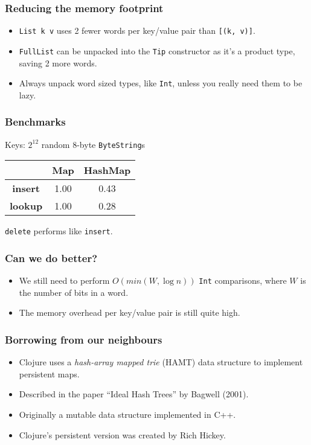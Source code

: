 \documentclass{beamer}
\begin{document}
\begin{frame}
  \frametitle{Reducing the memory footprint}
  \begin{itemize}
  \item \lstinline!List k v! uses 2 fewer words per key/value pair
    than \lstinline![(k, v)]!.
  \item \lstinline!FullList! can be unpacked into the \lstinline!Tip!
    constructor as it's a product type, saving 2 more words.
  \item Always unpack word sized types, like \lstinline!Int!, unless
    you really need them to be lazy.
  \end{itemize}
\end{frame}

\begin{frame}
  \frametitle{Benchmarks}

  Keys: $2^{12}$ random 8-byte \lstinline!ByteString!s

  \bigskip
  \begin{tabular}{|c|c|c|}
    \hline  & \textbf{Map} & \textbf{HashMap} \\
    \hline \textbf{insert} & 1.00 & 0.43 \\
    \hline \textbf{lookup} & 1.00 & 0.28 \\
    \hline
  \end{tabular}
  \bigskip

  \lstinline!delete! performs like \lstinline!insert!.
\end{frame}

\begin{frame}
  \frametitle{Can we do better?}
  \begin{itemize}
  \item We still need to perform $O(min(W, \log n))$ \lstinline!Int!
    comparisons, where $W$ is the number of bits in a word.
  \item The memory overhead per key/value pair is still quite high.
  \end{itemize}
\end{frame}

\begin{frame}
  \frametitle{Borrowing from our neighbours}
  \begin{itemize}
  \item Clojure uses a \emph{hash-array mapped trie} (HAMT) data
    structure to implement persistent maps.
  \item Described in the paper ``Ideal Hash Trees'' by Bagwell (2001).
  \item Originally a mutable data structure implemented in C++.
  \item Clojure's persistent version was created by Rich Hickey.
  \end{itemize}
\end{frame}
\end{document}
